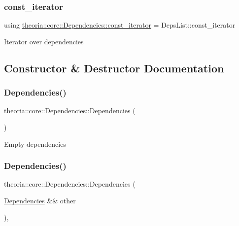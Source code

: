 \subsubsection{\texorpdfstring{const\+\_\+iterator}{const\_iterator}}
{\footnotesize\ttfamily using \hyperlink{classtheoria_1_1core_1_1Dependencies_af58b879e807df8fb52b96c9ab1eb6073}{theoria\+::core\+::\+Dependencies\+::const\+\_\+iterator} =  Deps\+List\+::const\+\_\+iterator}

Iterator over dependencies 

\subsection{Constructor \& Destructor Documentation}
\mbox{\label{classtheoria_1_1core_1_1Dependencies_ae3db86a4936549bceb0a358fa0b695e4}} 
\subsubsection{\texorpdfstring{Dependencies()}{Dependencies()}\hspace{0.1cm}{\footnotesize\ttfamily [1/3]}}
{\footnotesize\ttfamily theoria\+::core\+::\+Dependencies\+::\+Dependencies (\begin{DoxyParamCaption}{ }\end{DoxyParamCaption})\hspace{0.3cm}{\ttfamily [inline]}}

Empty dependencies \mbox{\label{classtheoria_1_1core_1_1Dependencies_a71b275a54e4261724540c60818d4ef85}} 
\subsubsection{\texorpdfstring{Dependencies()}{Dependencies()}\hspace{0.1cm}{\footnotesize\ttfamily [2/3]}}
{\footnotesize\ttfamily theoria\+::core\+::\+Dependencies\+::\+Dependencies (\begin{DoxyParamCaption}\item[{\hyperlink{classtheoria_1_1core_1_1Dependencies}{Dependencies} \&\&}]{other }\end{DoxyParamCaption})\hspace{0.3cm}{\ttfamily [inline]}, {\ttfamily [noexcept]}}

